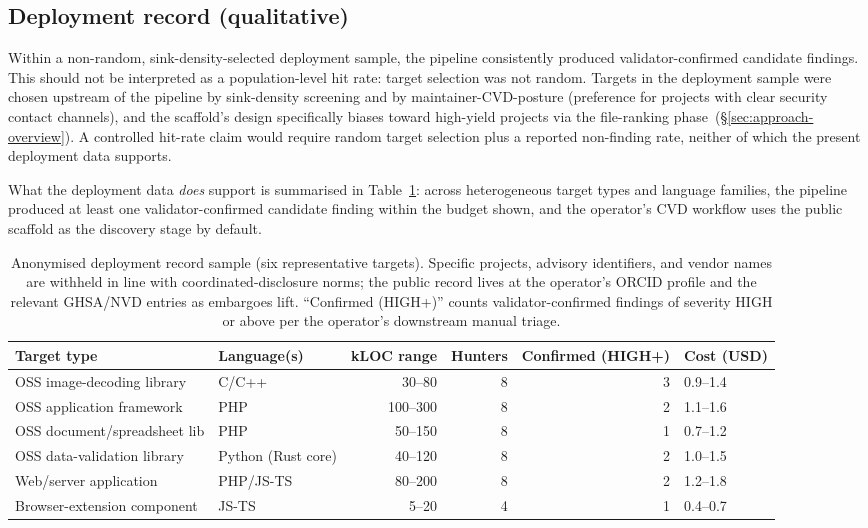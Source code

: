 \documentclass[11pt,a4paper]{article}
\begin{document}
\subsection{Deployment record (qualitative)}
\label{sec:eval-yield}

Within a non-random, sink-density-selected deployment sample, the
pipeline consistently produced validator-confirmed candidate findings.
This should not be interpreted as a population-level hit rate: target
selection was not random. Targets in the deployment sample were chosen
upstream of the pipeline by sink-density screening and by
maintainer-CVD-posture (preference for projects with clear security
contact channels), and the scaffold's design specifically biases toward
high-yield projects via the file-ranking phase~(\S\ref{sec:approach-overview}).
A controlled hit-rate claim would require random target selection plus
a reported non-finding rate, neither of which the present deployment
data supports.

What the deployment data \emph{does} support is summarised in
Table~\ref{tab:deployment}: across heterogeneous target types and
language families, the pipeline produced at least one
validator-confirmed candidate finding within the budget shown, and the
operator's CVD workflow uses the public scaffold as the discovery stage
by default.

\begin{table}[h]
\centering
\small
\begin{tabularx}{\linewidth}{@{}llrrrX@{}}
\toprule
Target type & Language(s) & kLOC range & Hunters & Confirmed (HIGH+) & Cost (USD) \\
\midrule
OSS image-decoding library & C/C++         & 30--80   & 8 & 3 & 0.9--1.4 \\
OSS application framework  & PHP           & 100--300 & 8 & 2 & 1.1--1.6 \\
OSS document/spreadsheet lib & PHP         & 50--150  & 8 & 1 & 0.7--1.2 \\
OSS data-validation library & Python (Rust core) & 40--120 & 8 & 2 & 1.0--1.5 \\
Web/server application      & PHP/JS-TS    & 80--200  & 8 & 2 & 1.2--1.8 \\
Browser-extension component & JS-TS        & 5--20    & 4 & 1 & 0.4--0.7 \\
\bottomrule
\end{tabularx}
\caption{Anonymised deployment record sample (six representative
targets). Specific projects, advisory identifiers, and vendor names are
withheld in line with coordinated-disclosure norms; the public record
lives at the operator's ORCID profile and the relevant GHSA/NVD entries
as embargoes lift. ``Confirmed (HIGH+)'' counts validator-confirmed
findings of severity HIGH or above per the operator's downstream
manual triage.}
\label{tab:deployment}
\end{table}
\end{document}
